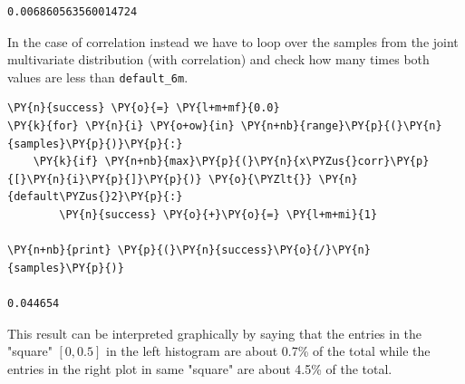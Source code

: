 \begin{Answer}
\begin{tcolorbox}[size=fbox, boxrule=1pt, colback=cellbackground, colframe=cellborder]
\begin{Verbatim}[commandchars=\\\{\}]
0.006860563560014724
\end{Verbatim}
\end{tcolorbox}

In the case of correlation instead we have to loop over the samples from the joint multivariate distribution (with correlation) and check how many times both values are less than \texttt{default\_6m}.

\begin{tcolorbox}[size=fbox, boxrule=1pt, colback=cellbackground, colframe=cellborder]
\begin{Verbatim}[commandchars=\\\{\}]
\PY{n}{success} \PY{o}{=} \PY{l+m+mf}{0.0}
\PY{k}{for} \PY{n}{i} \PY{o+ow}{in} \PY{n+nb}{range}\PY{p}{(}\PY{n}{samples}\PY{p}{)}\PY{p}{:}
    \PY{k}{if} \PY{n+nb}{max}\PY{p}{(}\PY{n}{x\PYZus{}corr}\PY{p}{[}\PY{n}{i}\PY{p}{]}\PY{p}{)} \PY{o}{\PYZlt{}} \PY{n}{default\PYZus{}2}\PY{p}{:}
        \PY{n}{success} \PY{o}{+}\PY{o}{=} \PY{l+m+mi}{1}
		
\PY{n+nb}{print} \PY{p}{(}\PY{n}{success}\PY{o}{/}\PY{n}{samples}\PY{p}{)}

0.044654
\end{Verbatim}
\end{tcolorbox}

This result can be interpreted graphically by saying that the entries in the "square" $[0, 0.5]$ in the left histogram are about 0.7\% of the total while the entries in the right plot in same "square" are about 4.5\% of the total. 
\end{Answer}